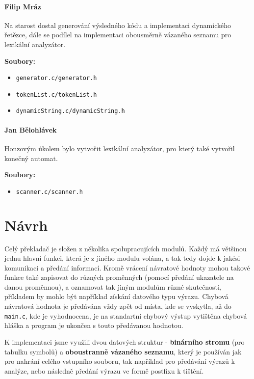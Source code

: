 \documentclass[czech,a4paper,12pt]{article}[]
\begin{document}
\paragraph{Filip Mráz}
\begin{inpar}
Na starost dostal generování výsledného kódu a implementaci dynamického řetězce, dále se podílel na implementaci obousměrně vázaného seznamu pro lexikální analyzátor.

\medskip
\textbf{Soubory:}
\begin{itemize}
    \item \texttt{generator.c/generator.h}
    \item \texttt{tokenList.c/tokenList.h}
    \item \texttt{dynamicString.c/dynamicString.h}
\end{itemize}
\end{inpar}

\paragraph{Jan Bělohlávek}
\begin{inpar}
Honzovým úkolem bylo vytvořit lexikální analyzátor, pro který také vytvořil konečný automat.

\medskip
\textbf{Soubory:}
\begin{itemize}
    \item \texttt{scanner.c/scanner.h}
\end{itemize}
\end{inpar}

\newpage
\section{Návrh}
Celý překladač je složen z několika spolupracujících modulů. Každý má většinou jednu hlavní funkci, která je z jiného modulu volána, a tak tedy dojde k jakési komunikaci a předání informací. Kromě vrácení návratové hodnoty mohou takové funkce také zapisovat do různých proměnných (pomocí předání ukazatele na danou proměnnou), a oznamovat tak jiným modulům různé skutečnosti, příkladem by mohlo být například získání datového typu výrazu. Chybová návratová hodnota je předávána vždy zpět od místa, kde se vyskytla, až do \texttt{main.c}, kde je vyhodnocena, je na standartní chybový výstup vytištěna chybová hláška a program je ukončen s touto předávanou hodnotou.

\smallskip
K implementaci jsme využili dvou datových struktur - \textbf{binárního stromu} (pro tabulku symbolů) a \textbf{oboustranně vázaného seznamu}, který je používán jak pro nahrání celého vstupního souboru, tak například pro předávání výrazů k analýze, nebo následně předání výrazu ve formě postfixu k tištění. 
\end{document}
